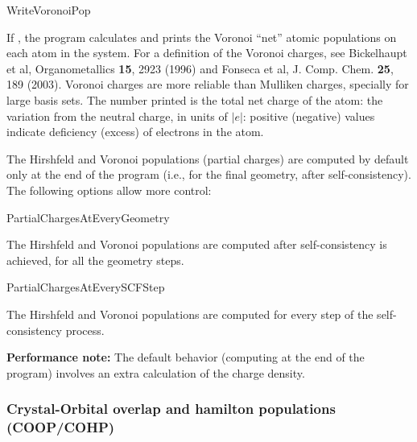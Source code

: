 \begin{fdflogicalF}{WriteVoronoiPop}

  If \fdftrue, the program calculates and prints the Voronoi ``net''
  atomic populations on each atom in the system. For a definition of
  the Voronoi charges, see Bickelhaupt et al, Organometallics
  \textbf{15}, 2923 (1996) and Fonseca et al,
  J. Comp. Chem. \textbf{25}, 189 (2003).  Voronoi charges are more
  reliable than Mulliken charges, specially for large basis sets.  The
  number printed is the total net charge of the atom: the variation
  from the neutral charge, in units of $|e|$: positive (negative)
  values indicate deficiency (excess) of electrons in the atom.

\end{fdflogicalF}

The Hirshfeld and Voronoi populations (partial charges) are computed
by default only at the end of the program (i.e., for the final
geometry, after self-consistency). The following options allow more
control:

\begin{fdflogicalF}{PartialChargesAtEveryGeometry}

  The Hirshfeld and Voronoi populations are computed after
  self-consistency is achieved, for all the geometry steps.

\end{fdflogicalF}

\begin{fdflogicalF}{PartialChargesAtEverySCFStep}

  The Hirshfeld and Voronoi populations are computed for every step of
  the self-consistency process.

\end{fdflogicalF}

\textbf{Performance note:}
The default behavior (computing at the end of the program) involves
an extra calculation of the charge density.



\subsubsection{Crystal-Orbital overlap and hamilton populations (COOP/COHP)}
\label{sec:coop}

